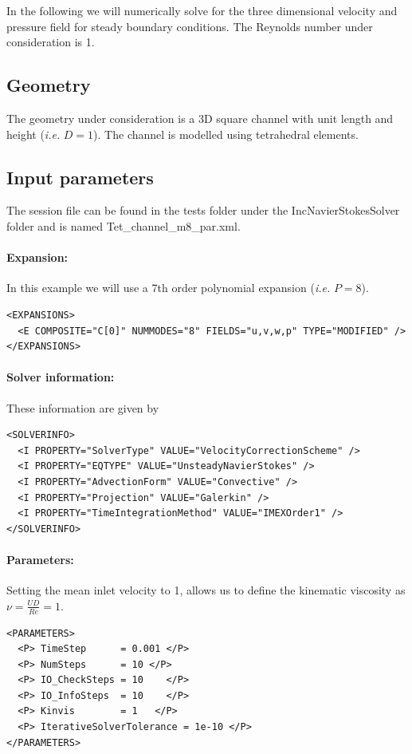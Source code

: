 In the following we will numerically solve for the three dimensional velocity and pressure field for steady boundary conditions. The Reynolds number under consideration is 1.

\subsection{Geometry}
The geometry under consideration is a 3D square channel with unit length and height (\textit{i.e.} $D=1$). The channel is modelled using tetrahedral elements.

\subsection{Input parameters}
The session file can be found in the tests folder under the IncNavierStokesSolver folder and is named Tet\_channel\_m8\_par.xml.

\paragraph{Expansion:~} In this example we will use a 7th order polynomial expansion (\textit{i.e.} $P=8$).
\begin{lstlisting}[style=XMLStyle]
<EXPANSIONS>
  <E COMPOSITE="C[0]" NUMMODES="8" FIELDS="u,v,w,p" TYPE="MODIFIED" />
</EXPANSIONS>
\end{lstlisting}

\paragraph{Solver information:~} These information are given by
\begin{lstlisting}[style=XMLStyle]
<SOLVERINFO>
  <I PROPERTY="SolverType" VALUE="VelocityCorrectionScheme" />
  <I PROPERTY="EQTYPE" VALUE="UnsteadyNavierStokes" />
  <I PROPERTY="AdvectionForm" VALUE="Convective" />
  <I PROPERTY="Projection" VALUE="Galerkin" />
  <I PROPERTY="TimeIntegrationMethod" VALUE="IMEXOrder1" />
</SOLVERINFO>
\end{lstlisting}

\paragraph{Parameters:~} Setting the mean inlet velocity to 1, allows us to define the kinematic viscosity as $\nu = \frac{UD}{Re}=1$.
\begin{lstlisting}[style=XMLStyle]
<PARAMETERS>
  <P> TimeStep      = 0.001 </P>
  <P> NumSteps      = 10 </P>
  <P> IO_CheckSteps = 10    </P>
  <P> IO_InfoSteps  = 10    </P>
  <P> Kinvis        = 1   </P>
  <P> IterativeSolverTolerance = 1e-10 </P>
</PARAMETERS>
\end{lstlisting}

